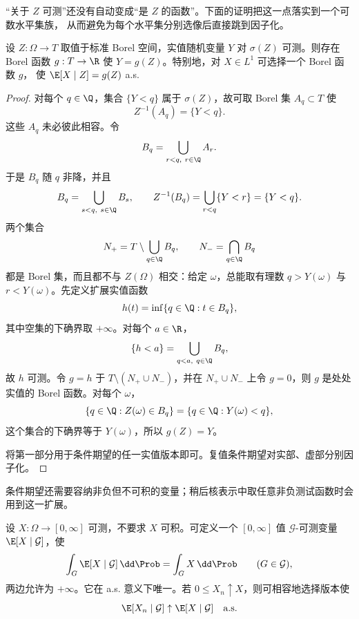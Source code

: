 “关于 $Z$ 可测”还没有自动变成“是 $Z$ 的函数”。下面的证明把这一点落实到一个可数水平集族，
从而避免为每个水平集分别选像后直接跳到因子化。

\begin{proposition}\label{proposition:5-2-1-doob-dynkin}
设 $Z:\Omega\to T$ 取值于标准 Borel 空间，实值随机变量 $Y$ 对 $\sigma(Z)$ 可测。则存在
Borel 函数 $g:T\to\R$ 使 $Y=g(Z)$。特别地，对 $X\in L^1$ 可选择一个 Borel 函数 $g$，
使 $\E[X\mid Z]=g(Z)$ a.s.
\end{proposition}

\begin{proof}
对每个 $q\in\Q$，集合 $\{Y<q\}$ 属于 $\sigma(Z)$，故可取 Borel 集
$A_q\subset T$ 使
\[
 Z^{-1}(A_q)=\{Y<q\}.
\]
这些 $A_q$ 未必彼此相容。令
\[
 B_q=\bigcup_{r<q,\ r\in\Q}A_r.
\]
于是 $B_q$ 随 $q$ 非降，并且
\[
 B_q=\bigcup_{s<q,\ s\in\Q}B_s,
 \qquad
 Z^{-1}(B_q)=\bigcup_{r<q}\{Y<r\}=\{Y<q\}.
\]
两个集合
\[
 N_+=T\setminus\bigcup_{q\in\Q}B_q,
 \qquad
 N_- =\bigcap_{q\in\Q}B_q
\]
都是 Borel 集，而且都不与 $Z(\Omega)$ 相交：给定 $\omega$，总能取有理数
$q>Y(\omega)$ 与 $r<Y(\omega)$。先定义扩展实值函数
\[
 h(t)=\inf\{q\in\Q:t\in B_q\},
\]
其中空集的下确界取 $+\infty$。对每个 $a\in\R$，
\[
 \{h<a\}=\bigcup_{q<a,\ q\in\Q}B_q,
\]
故 $h$ 可测。令 $g=h$ 于 $T\setminus(N_+\cup N_-)$，并在
$N_+\cup N_-$ 上令 $g=0$，则 $g$ 是处处实值的 Borel 函数。对每个 $\omega$，
\[
 \{q\in\Q:Z(\omega)\in B_q\}=\{q\in\Q:Y(\omega)<q\},
\]
这个集合的下确界等于 $Y(\omega)$，所以 $g(Z)=Y$。

将第一部分用于条件期望的任一实值版本即可。复值条件期望对实部、虚部分别因子化。
\end{proof}

条件期望还需要容纳非负但不可积的变量；稍后核表示中取任意非负测试函数时会用到这一扩展。

\begin{proposition}[非负变量的扩展条件期望]\label{proposition:5-2-1-nonnegative}
设 $X:\Omega\to[0,\infty]$ 可测，不要求 $X$ 可积。可定义一个
$[0,\infty]$ 值 $\mathcal G$-可测变量 $\E[X\mid\mathcal G]$，使
\begin{equation}\label{eq:5-2-extended-ce}
 \int_G\E[X\mid\mathcal G]\,\dd\Prob
 =\int_GX\,\dd\Prob\qquad(G\in\mathcal G),
\end{equation}
两边允许为 $+\infty$。它在 a.s. 意义下唯一。若 $0\leq X_n\uparrow X$，则可相容地选择版本使
\begin{equation}\label{eq:5-2-conditional-mct}
 \E[X_n\mid\mathcal G]\uparrow\E[X\mid\mathcal G]
 \quad\text{a.s.}
\end{equation}
\end{proposition}

